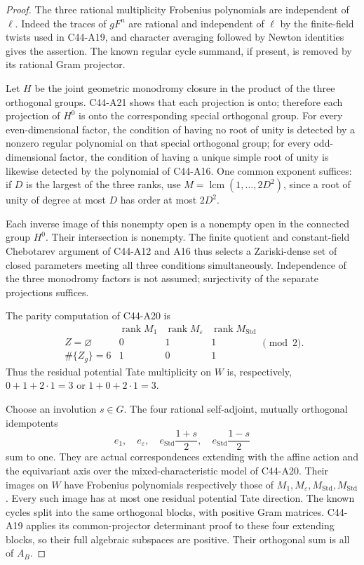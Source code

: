 \documentclass[11pt]{article}
\theoremstyle{remark}\newtheorem{remark}[theorem]{Remark}
\begin{document}
\begin{proof}
The three rational multiplicity Frobenius polynomials are independent of
$\ell$.  Indeed the traces of $gF^n$ are rational and independent of
$\ell$ by the finite-field twists used in C44-A19, and character averaging
followed by Newton identities gives the assertion.  The known regular
cycle summand, if present, is removed by its rational Gram projector.

Let $H$ be the joint geometric monodromy closure in the product of the
three orthogonal groups.  C44-A21 shows that each projection is onto;
therefore each projection of $H^0$ is onto the corresponding special
orthogonal group.  For every even-dimensional factor, the condition of
having no root of unity is detected by a nonzero regular polynomial on
that special orthogonal group; for every odd-dimensional factor, the
condition of having a unique simple root of unity is likewise detected
by the polynomial of C44-A16.  One common exponent suffices: if $D$ is
the largest of the three ranks, use
$M=\operatorname{lcm}(1,\ldots,2D^2)$, since a root of unity of degree at
most $D$ has order at most $2D^2$.

Each inverse image of this nonempty open is a nonempty open in the
connected group $H^0$.  Their intersection is nonempty.  The finite
quotient and constant-field Chebotarev argument of C44-A12 and A16 thus
selects a Zariski-dense set of closed parameters meeting all three
conditions simultaneously.  Independence of the three monodromy factors
is not assumed; surjectivity of the separate projections suffices.

The parity computation of C44-A20 is
\[
 \begin{array}{c|ccc}
 &\operatorname{rank}M_1&\operatorname{rank}M_\varepsilon
                                  &\operatorname{rank}M_{\mathrm{Std}}\\\hline
 Z=\varnothing&0&1&1\\
 \#\{Z_g\}=6&1&0&1
 \end{array}\pmod2.                                               \tag{A21.14}
\]
Thus the residual potential Tate multiplicity on $W$ is, respectively,
$0+1+2\cdot1=3$ or $1+0+2\cdot1=3$.

Choose an involution $s\in G$.  The four rational self-adjoint,
mutually orthogonal idempotents
\[
 e_1,\quad e_\varepsilon,\quad
       e_{\mathrm{Std}}\frac{1+s}{2},\quad
       e_{\mathrm{Std}}\frac{1-s}{2}                              \tag{A21.15}
\]
sum to one.  They are actual correspondences extending with the affine
action and the equivariant axis over the mixed-characteristic model of
C44-A20.  Their images on $W$ have Frobenius polynomials respectively
those of $M_1,M_\varepsilon,M_{\mathrm{Std}},M_{\mathrm{Std}}$.
Every such image has at most one residual potential Tate direction.
The known cycles split into the same orthogonal blocks, with positive
Gram matrices.  C44-A19 applies its common-projector determinant proof
to these four extending blocks, so their full algebraic subspaces are
positive.  Their orthogonal sum is all of $A_B$.


\end{proof}
\end{document}
